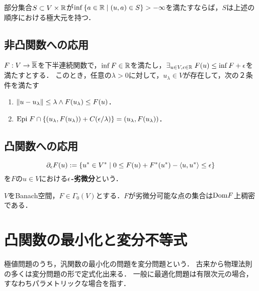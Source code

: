 \documentclass[uplatex,dvipdfmx]{jsreport}
\begin{document}
\begin{proposition}
    部分集合$S\subset V\times\mathbb{R}$が$\inf\left\{a\in\mathbb{R}\mid(u,a)\in S\right\}>-\infty$を満たすならば，$S$は上述の順序における極大元を持つ．
\end{proposition}

\subsection{非凸関数への応用}

\begin{theorem}
    $F:V\to\overline{\mathbb{R}}$を下半連続関数で，$\inf F\in\mathbb{R}$を満たし，$\exists_{u\in V,\epsilon\in\mathbb{R}}\;F(u)\le\inf F+\epsilon$を満たすとする．
    このとき，任意の$\lambda>0$に対して，$u_\lambda\in V$が存在して，次の２条件を満たす
    \begin{enumerate}
        \item $\|u-u_\lambda\|\le\lambda\land F(u_\lambda)\le F(u)$．
        \item $\mathrm{Epi}\; F\cap\left\{(u_\lambda,F(u_\lambda))+C(\epsilon/\lambda)\right\}=(u_\lambda,F(u_\lambda))$．
    \end{enumerate}
\end{theorem}

\subsection{凸関数への応用}

\begin{definition}
    \[\partial_\epsilon F(u):=\left\{u^*\in V^*\mid 0\le F(u)+F^*(u^*)-\langle u,u^*\rangle\le\epsilon\right\}\]
    を$F$の$u\in V$における\textbf{$\epsilon$-劣微分}という．
\end{definition}

\begin{theorem}
    
\end{theorem}

\begin{corollary}\label{cor-subdifferentiable-points-of-Banach-operator}
    $V$をBanach空間，$F\in\Gamma_0(V)$とする．$F$が劣微分可能な点の集合は$\mathrm{Dom} F$上稠密である．
\end{corollary}

\section{凸関数の最小化と変分不等式}

\begin{tcolorbox}[colframe=ForestGreen, colback=ForestGreen!10!white,breakable,colbacktitle=ForestGreen!40!white,coltitle=black,fonttitle=\bfseries\sffamily,
title=]
    極値問題のうち，汎関数の最小化の問題を変分問題という．
    古来から物理法則の多くは変分問題の形で定式化出来る．
    一般に最適化問題は有限次元の場合，すなわちパラメトリックな場合を指す．
\end{tcolorbox}
\end{document}
